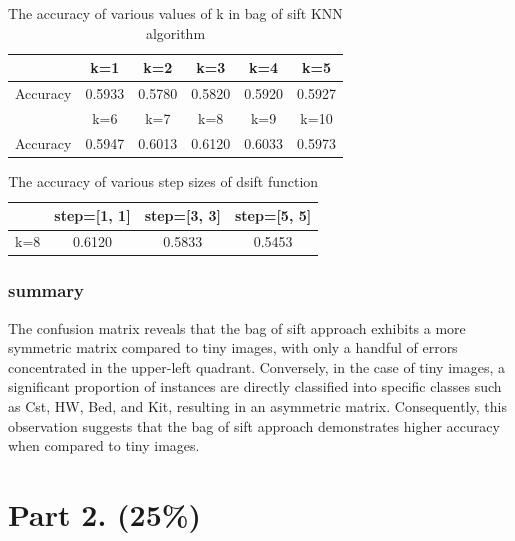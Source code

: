 \documentclass[a4paper, 12pt]{article}
\begin{document}
\begin{table}[!htb]
    \centering
    \caption{The accuracy of various values of k in bag of sift KNN algorithm}
    \begin{tabular}{|c|c|c|c|c|c|}
        \hline
                 & k=1    & k=2    & k=3    & k=4    & k=5    \\
        \hline
        Accuracy & 0.5933 & 0.5780 & 0.5820 & 0.5920 & 0.5927 \\
        \hline
                 & k=6    & k=7    & k=8    & k=9    & k=10   \\
        \hline
        Accuracy & 0.5947 & 0.6013 & 0.6120 & 0.6033 & 0.5973 \\
        \hline
    \end{tabular}
\end{table}

\begin{table}[!htb]
    \centering
    \caption{The accuracy of various step sizes of dsift function}
    \begin{tabular}{|c|c|c|c|}
        \hline
            & step=[1, 1] & step=[3, 3] & step=[5, 5] \\
        \hline
        k=8 & 0.6120      & 0.5833      & 0.5453      \\
        \hline
    \end{tabular}
\end{table}

\subsubsection{summary}
The confusion matrix reveals that the bag of sift approach exhibits a more symmetric matrix compared to tiny images, with only a handful of errors concentrated in the upper-left quadrant. Conversely, in the case of tiny images, a significant proportion of instances are directly classified into specific classes such as Cst, HW, Bed, and Kit, resulting in an asymmetric matrix. Consequently, this observation suggests that the bag of sift approach demonstrates higher accuracy when compared to tiny images.

\section{Part 2. (25\%)}
\end{document}
